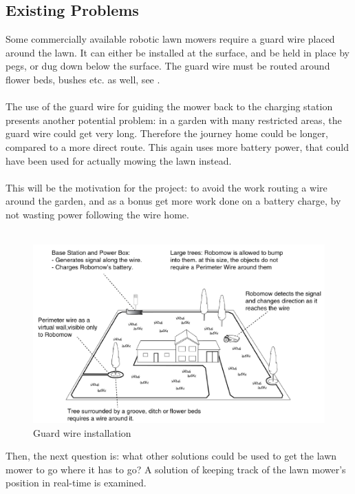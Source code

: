 \subsection{Existing Problems}
Some commercially available robotic lawn mowers require a guard wire placed around the lawn. It can either be installed at the surface, and be held in place by pegs, or dug down below the surface\cite{Robomow}. The guard wire must be routed around flower beds, bushes etc. as well, see .\\\\
%
The use of the guard wire for guiding the mower back to the charging station presents another potential problem: in a garden with many restricted areas, the guard wire could get very long. Therefore the journey home could be longer, compared to a more direct route. This again uses more battery power, that could have been used for actually mowing the lawn instead.\\\\
%
This will be the motivation for the project: to avoid the work routing a wire around the garden, and as a bonus get more work done on a battery charge, by not wasting power following the wire home.\\\\

\begin{figure}[H]
\centering
\includegraphics[scale=0.6]{figures/robomow.png} 
\caption{Guard wire installation \cite{Robomow}}
\label{fig:robomow} 
\end{figure}
\noindent

Then, the next question is: what other solutions could be used to get the lawn mower to go where it has to go?
A solution of keeping track of the lawn mower's position in real-time is examined.